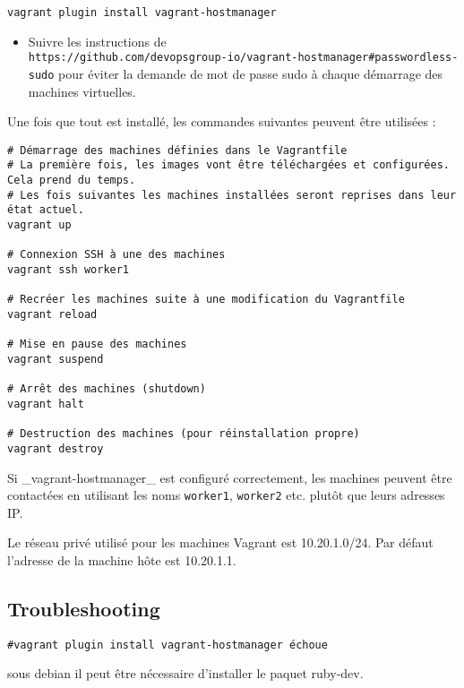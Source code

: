 \documentclass[a4paper,oneside,11pt]{article}
\begin{document}
\begin{verbatim}
vagrant plugin install vagrant-hostmanager
\end{verbatim}

\begin{itemize}
\item Suivre les instructions de \\
	\texttt{https://github.com/devopsgroup-io/vagrant-hostmanager\#passwordless-sudo} pour éviter la demande de mot de passe sudo à chaque démarrage des machines virtuelles.
\end{itemize}
Une fois que tout est installé, les commandes suivantes peuvent être utilisées :

\begin{verbatim}
# Démarrage des machines définies dans le Vagrantfile
# La première fois, les images vont être téléchargées et configurées. Cela prend du temps.
# Les fois suivantes les machines installées seront reprises dans leur état actuel.
vagrant up

# Connexion SSH à une des machines
vagrant ssh worker1

# Recréer les machines suite à une modification du Vagrantfile
vagrant reload

# Mise en pause des machines
vagrant suspend

# Arrêt des machines (shutdown)
vagrant halt

# Destruction des machines (pour réinstallation propre)
vagrant destroy
\end{verbatim}

Si \_vagrant-hostmanager\_ est configuré correctement, les machines peuvent être contactées en utilisant les noms \verb!worker1!, \verb!worker2! etc. plutôt que leurs adresses IP.

Le réseau privé utilisé pour les machines Vagrant est 10.20.1.0/24. Par défaut l'adresse de la machine hôte est 10.20.1.1.

\subsection{Troubleshooting}

\verb!#vagrant plugin install vagrant-hostmanager échoue!

sous debian il peut être nécessaire d'installer le paquet ruby-dev.
\end{document}
